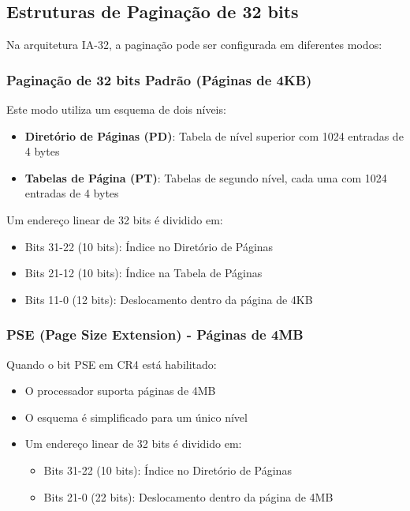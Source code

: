\subsection{Estruturas de Paginação de 32 bits}
\label{subsec:estruturas_paginacao_32bits}

Na arquitetura IA-32, a paginação pode ser configurada em diferentes modos:

\subsubsection{Paginação de 32 bits Padrão (Páginas de 4KB)}

Este modo utiliza um esquema de dois níveis:

\begin{itemize}
    \item \textbf{Diretório de Páginas (PD)}: Tabela de nível superior com 1024 entradas de 4 bytes
    \item \textbf{Tabelas de Página (PT)}: Tabelas de segundo nível, cada uma com 1024 entradas de 4 bytes
\end{itemize}

Um endereço linear de 32 bits é dividido em:
\begin{itemize}
    \item Bits 31-22 (10 bits): Índice no Diretório de Páginas
    \item Bits 21-12 (10 bits): Índice na Tabela de Páginas
    \item Bits 11-0 (12 bits): Deslocamento dentro da página de 4KB
\end{itemize}

\subsubsection{PSE (Page Size Extension) - Páginas de 4MB}

Quando o bit PSE em CR4 está habilitado:
\begin{itemize}
    \item O processador suporta páginas de 4MB
    \item O esquema é simplificado para um único nível
    \item Um endereço linear de 32 bits é dividido em:
    \begin{itemize}
        \item Bits 31-22 (10 bits): Índice no Diretório de Páginas
        \item Bits 21-0 (22 bits): Deslocamento dentro da página de 4MB
    \end{itemize}
\end{itemize}

